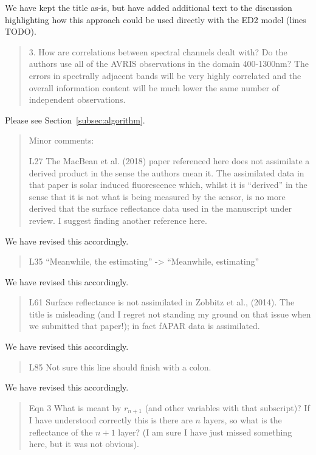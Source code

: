 We have kept the title as-is, but have added additional text to the discussion highlighting how this approach could be used directly with the ED2 model (lines TODO).

\begin{quote}
  3. How are correlations between spectral channels dealt with? Do the authors use all of the AVRIS observations in the domain 400-1300nm? The errors in spectrally adjacent bands will be very highly correlated and the overall information content will be much lower the same number of independent observations.
\end{quote}

Please see Section~\ref{subsec:algorithm}.

\begin{quote}
Minor comments:

L27 The MacBean et al. (2018) paper referenced here does not assimilate a derived product in the sense the authors mean it. The assimilated data in that paper is solar induced fluorescence which, whilst it is “derived” in the sense that it is not what is being measured by the sensor, is no more derived that the surface reflectance data used in the manuscript under review. I suggest finding another reference here.
\end{quote}

We have revised this accordingly.

\begin{quote}
L35 “Meanwhile, the estimating” -> “Meanwhile, estimating”
\end{quote}

We have revised this accordingly.

\begin{quote}
L61 Surface reflectance is not assimilated in Zobbitz et al., (2014). The title is misleading (and I regret not standing my ground on that issue when we submitted that paper!); in fact fAPAR data is assimilated.
\end{quote}

We have revised this accordingly.

\begin{quote}
L85 Not sure this line should finish with a colon.
\end{quote}

We have revised this accordingly.

\begin{quote}
Eqn 3 What is meant by $r_{n+1}$ (and other variables with that subscript)? If I have understood correctly this is there are $n$ layers, so what is the reflectance of the $n + 1$ layer? (I am sure I have just missed something here, but it was not obvious).
\end{quote}

